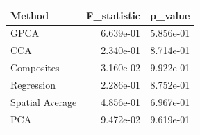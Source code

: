 \begin{tabular}{lrr}
\toprule
Method & F_statistic & p_value \\
\midrule
GPCA & 6.639e-01 & 5.856e-01 \\
CCA & 2.340e-01 & 8.714e-01 \\
Composites & 3.160e-02 & 9.922e-01 \\
Regression & 2.286e-01 & 8.752e-01 \\
Spatial Average & 4.856e-01 & 6.967e-01 \\
PCA & 9.472e-02 & 9.619e-01 \\
\bottomrule
\end{tabular}
